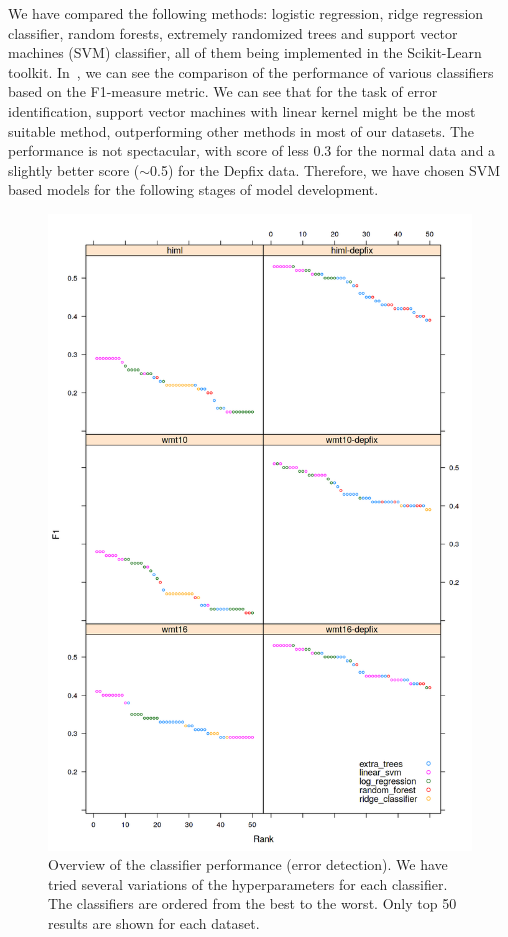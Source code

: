 We have compared the following methods: logistic regression, ridge regression classifier,
random forests, extremely randomized trees and support vector machines (SVM) classifier, all
of them being implemented in the Scikit-Learn toolkit.
In~, we can see the comparison of the performance of various classifiers based
on the F1-measure metric. We can see that for the task of error identification, support vector
machines with linear kernel might be the most suitable method, outperforming other methods in most of our
datasets. The  performance is not spectacular, with score of less 0.3 for the normal data
and a slightly better score ($\sim$0.5) for the Depfix data. Therefore, we have chosen SVM based
models for the following stages of model development.

\begin{figure}
\centering
  \includegraphics[scale=0.7]{wf-class}
  \caption[ML method comparison - Error detection]{
    Overview of the classifier performance (error detection).
We have tried several variations of the hyperparameters
for each classifier. The classifiers are ordered from the best to the worst. Only top 50 results
are shown for each dataset.
}
  \label{wf-draft}
\end{figure}

